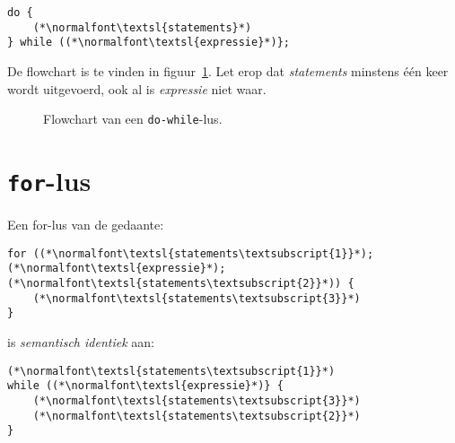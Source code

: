 \begin{lstlisting}[caption=Do-while-lus in C.]
do {
    (*\normalfont\textsl{statements}*)
} while ((*\normalfont\textsl{expressie}*)};
\end{lstlisting}

De flowchart is te vinden in figuur~\ref{fig:flodowhile}.
Let erop dat \textsl{statements} minstens \'e\'en keer wordt uitgevoerd, ook al is \textsl{expressie}
niet waar.

\begin{figure}[!ht]
\centering
{}
\caption{Flowchart van een \texttt{do-while}-lus.}
\label{fig:flodowhile}
\end{figure}


\newpage
\section{\texttt{for}-lus}

Een for-lus van de gedaante:
\newpage
\begin{lstlisting}[caption=\texttt{for}-lus in C.]
for ((*\normalfont\textsl{statements\textsubscript{1}}*); (*\normalfont\textsl{expressie}*); (*\normalfont\textsl{statements\textsubscript{2}}*)) {
    (*\normalfont\textsl{statements\textsubscript{3}}*)
}
\end{lstlisting}

is \textsl{semantisch identiek} aan:

\begin{lstlisting}[caption=\texttt{for}-lus herschreven als \texttt{while}-lus in C.]
(*\normalfont\textsl{statements\textsubscript{1}}*)
while ((*\normalfont\textsl{expressie}*)} {
    (*\normalfont\textsl{statements\textsubscript{3}}*)
    (*\normalfont\textsl{statements\textsubscript{2}}*)
}
\end{lstlisting}

